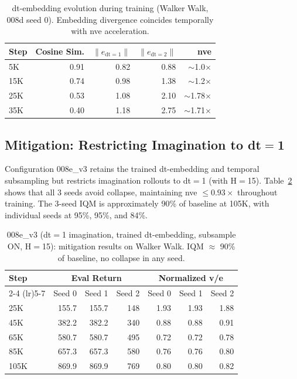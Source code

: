 \documentclass[letterpaper]{article}
\begin{document}
\begin{table}[t]
\centering
\caption{dt-embedding evolution during training (Walker Walk, 008d seed 0). Embedding divergence coincides temporally with nve acceleration.}
\label{tab:embedding_cosine}
\small
\begin{tabular}{lrrrr}
\toprule
\textbf{Step} & \textbf{Cosine Sim.} & \textbf{$\|e_{\text{dt}=1}\|$} & \textbf{$\|e_{\text{dt}=2}\|$} & \textbf{nve} \\
\midrule
5K & 0.91 & 0.82 & 0.88 & $\sim$1.0$\times$ \\
15K & 0.74 & 0.98 & 1.38 & $\sim$1.2$\times$ \\
25K & 0.53 & 1.08 & 2.10 & $\sim$1.78$\times$ \\
35K & 0.40 & 1.18 & 2.75 & $\sim$1.71$\times$ \\
\bottomrule
\end{tabular}
\end{table}

\subsection{Mitigation: Restricting Imagination to dt$=$1}
\label{sec:results_mitigation}

Configuration 008e\_v3 retains the trained dt-embedding and temporal subsampling but restricts imagination rollouts to dt$=$1 (with H$=$15).
Table~\ref{tab:mitigation} shows that all 3 seeds avoid collapse, maintaining nve $\leq 0.93\times$ throughout training.
The 3-seed IQM is approximately 90\% of baseline at 105K, with individual seeds at 95\%, 95\%, and 84\%.

\begin{table}[t]
\centering
\caption{008e\_v3 (dt$=$1 imagination, trained dt-embedding, subsample ON, H$=$15): mitigation results on Walker Walk. IQM $\approx$ 90\% of baseline, no collapse in any seed.}
\label{tab:mitigation}
\small
\begin{tabular}{lrrrrrr}
\toprule
Step & \multicolumn{3}{c}{Eval Return} & \multicolumn{3}{c}{Normalized v/e} \\
\cmidrule(lr){2-4} \cmidrule(lr){5-7}
& Seed 0 & Seed 1 & Seed 2 & Seed 0 & Seed 1 & Seed 2 \\
\midrule
25K & 155.7 & 155.7 & 148 & 1.93 & 1.93 & 1.88 \\
45K & 382.2 & 382.2 & 340 & 0.88 & 0.88 & 0.91 \\
65K & 580.7 & 580.7 & 495 & 0.72 & 0.72 & 0.78 \\
85K & 657.3 & 657.3 & 580 & 0.76 & 0.76 & 0.80 \\
105K & 869.9 & 869.9 & 769 & 0.80 & 0.80 & 0.82 \\
\bottomrule
\end{tabular}
\end{table}
\end{document}
